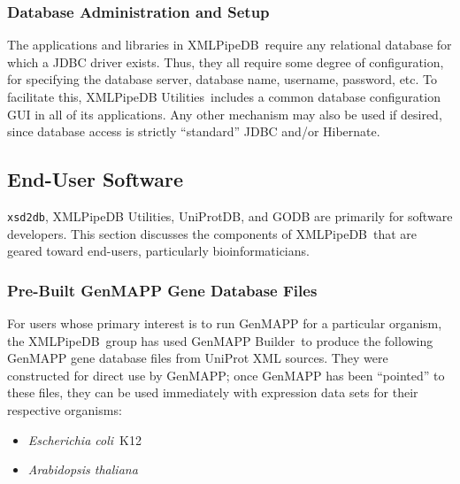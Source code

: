 \documentclass[10pt]{bmc_article}
\newenvironment{bmcformat}{\begin{raggedright}\baselineskip20pt\sloppy\setboolean{publ}{false}}{\end{raggedright}\baselineskip20pt\sloppy}
\def\xmlpipedb{XMLPipeDB}                       %
\def\xsd2db{\texttt{xsd2db}}
\def\xpdutils{XMLPipeDB Utilities}
\def\gmb{GenMAPP Builder}
\def\ecolifull{\emph{Escherichia coli}}
\def\athalianafull{\emph{Arabidopsis thaliana}}
\begin{document}
\begin{bmcformat}
\subsubsection*{Database Administration and Setup}

The applications and libraries in \xmlpipedb\ require any relational database for which a JDBC driver exists.  Thus, they all require some degree of configuration, for specifying the database server, database name, username, password, etc.  To facilitate this, \xpdutils\ includes a common database configuration GUI in all of its applications.  Any other mechanism may also be used if desired, since database access is strictly ``standard'' JDBC and/or Hibernate.\pb

\subsection*{End-User Software}
\label{endUserSoftware}

\xsd2db, \xpdutils, UniProtDB, and GODB are primarily for software developers.  This section discusses the components of \xmlpipedb\ that are geared toward end-users, particularly bioinformaticians.\pb

\subsubsection*{Pre-Built GenMAPP Gene Database Files}
\label{gdb}

For users whose primary interest is to run GenMAPP for a particular organism, the \xmlpipedb\ group has used \gmb\ to produce the following GenMAPP gene database files from UniProt XML sources.  They were constructed for direct use by GenMAPP; once GenMAPP has been ``pointed'' to these files, they can be used immediately with expression data sets for their respective organisms:
\begin{itemize}
\item \ecolifull\ K12
\item \athalianafull
\end{itemize}


\end{bmcformat}
\end{document}
